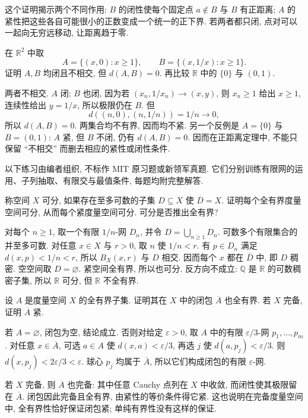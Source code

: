 这个证明揭示两个不同作用: $B$ 的闭性使每个固定点 $a\notin B$ 与 $B$ 有正距离; $A$ 的紧性把这些各自可能很小的正数变成一个统一的正下界. 若两者都只闭, 点对可以一起向无穷远移动, 让距离趋于零.

\begin{example}
在 $\mathbb{R}^2$ 中取
\[
 A=\{(x,0):x\geq1\},\qquad
 B=\{(x,1/x):x\geq1\}.
\]
证明 $A,B$ 均闭且不相交, 但 $d(A,B)=0$. 再比较 $\mathbb{R}$ 中的 $\{0\}$ 与 $(0,1)$.
\end{example}
\begin{solution}
两者不相交. $A$ 闭; $B$ 也闭, 因为若 $(x_n,1/x_n)\to(x,y)$, 则 $x_n\geq1$ 给出 $x\geq1$, 连续性给出 $y=1/x$, 所以极限仍在 $B$. 但
\[
 d((n,0),(n,1/n))=1/n\longrightarrow0,
\]
所以 $d(A,B)=0$. 两集合均不有界, 因而均不紧. 另一个反例是 $A=\{0\}$ 与 $B=(0,1)$: $A$ 紧, 但 $B$ 不闭, 仍有 $d(A,B)=0$. 因而在正距离定理中, 不能只保留 ``不相交'' 而删去相应的紧性或闭性条件.
\end{solution}

\label{ch:compact:exercises}

以下练习由编者组织, 不标作 MIT 原习题或新领军真题. 它们分别训练有限网的运用、子列抽取、有限交与最值条件, 每题均附完整解答.

\begin{exercise}
\label{ch:compact:ex-separable}
称空间 $X$ 可分, 如果存在至多可数的子集 $D\subseteq X$ 使 $\overline D=X$. 证明每个全有界度量空间可分, 从而每个紧度量空间可分. 可分是否推出全有界?
\end{exercise}
\begin{solution}
对每个 $n\geq1$, 取一个有限 $1/n$-网 $D_n$, 并令 $D=\bigcup_{n\geq1}D_n$. 可数多个有限集合的并至多可数. 对任意 $x\in X$ 与 $r>0$, 取 $n$ 使 $1/n<r$. 有 $p\in D_n$ 满足 $d(x,p)<1/n<r$, 所以 $B_X(x,r)$ 与 $D$ 相交. 因而每个 $x$ 都在 $\overline D$ 中, 即 $D$ 稠密. 空空间取 $D=\varnothing$. 紧空间全有界, 所以也可分. 反方向不成立: $\mathbb{Q}$ 是 $\mathbb{R}$ 的可数稠密子集, 所以 $\mathbb{R}$ 可分, 但 $\mathbb{R}$ 不全有界.
\end{solution}

\begin{exercise}
\label{ch:compact:ex-closure}
设 $A$ 是度量空间 $X$ 的全有界子集. 证明其在 $X$ 中的闭包 $\overline A$ 也全有界. 若 $X$ 完备, 证明 $\overline A$ 紧.
\end{exercise}
\begin{solution}
若 $A=\varnothing$, 闭包为空, 结论成立. 否则对给定 $\varepsilon>0$, 取 $A$ 中的有限 $\varepsilon/3$-网 $p_1,\ldots,p_m$. 对任意 $x\in\overline A$, 可选 $a\in A$ 使 $d(x,a)<\varepsilon/3$, 再选 $j$ 使 $d(a,p_j)<\varepsilon/3$. 则 $d(x,p_j)<2\varepsilon/3<\varepsilon$. 球心 $p_j$ 均属于 $\overline A$, 所以它们构成闭包的有限 $\varepsilon$-网.

若 $X$ 完备, 则 $\overline A$ 也完备: 其中任意 Cauchy 点列在 $X$ 中收敛, 而闭性使其极限留在 $\overline A$. 闭包因此完备且全有界, 由紧性的等价条件得它紧. 这也说明在完备度量空间中, 全有界性恰好保证闭包紧; 单纯有界性没有这样的保证.
\end{solution}

